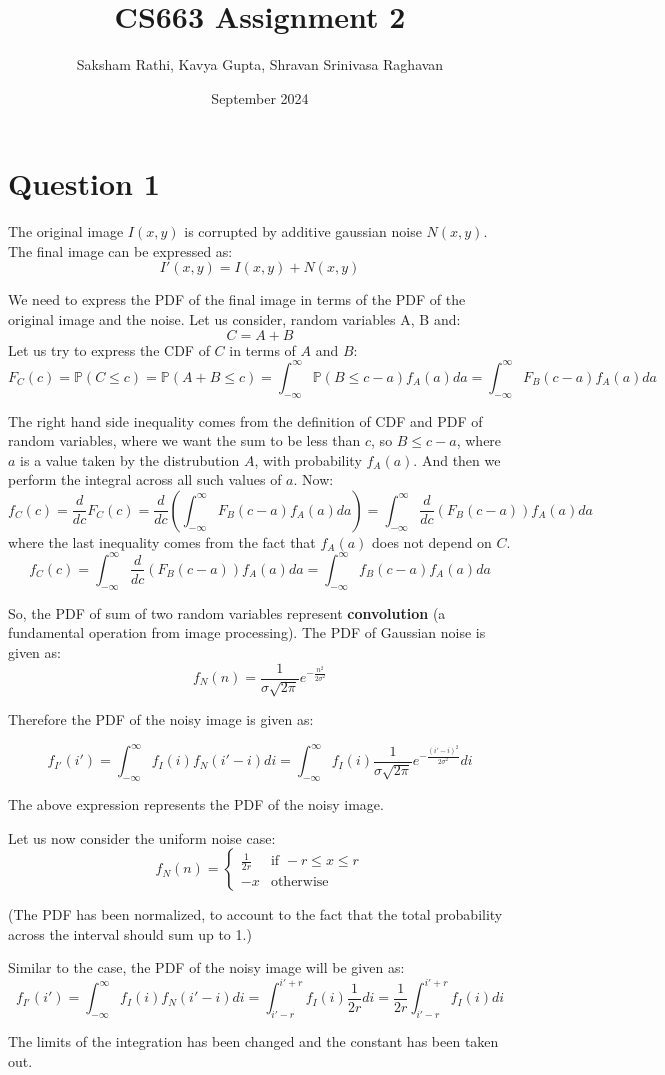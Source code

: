 \documentclass[12pt]{article}
\title{{\bf CS663 Assignment 2}}
\author{Saksham Rathi, Kavya Gupta, Shravan Srinivasa Raghavan}
\date{September 2024}
\begin{document}
\maketitle
\clearpage
\tableofcontents
\clearpage
\section*{Question 1}
The original image $I(x, y)$ is corrupted by additive gaussian noise $N(x, y)$. The final image can be expressed as:
\[I'(x, y) = I(x, y) + N(x, y)\]

We need to express the PDF of the final image in terms of the PDF of the original image and the noise. Let us consider, random variables A, B and:
\[C = A + B\]
Let us try to express the CDF of $C$ in terms of $A$ and $B$:
\[F_C(c) = \mathbb{P}(C \leq c) = \mathbb{P}(A+ B \leq c) = \int_{-\infty}^\infty \mathbb{P}(B \leq c - a)f_A(a)da = \int_{-\infty}^\infty F_B(c-a)f_A(a)da\]

The right hand side inequality comes from the definition of CDF and PDF of random variables, where we want the sum to be less than $c$, so $B\leq c-a$, where $a$ is a value taken by the distrubution $A$, with probability $f_A(a)$. And then we perform the integral across all such values of $a$. Now:
\[f_C(c) = \frac{d}{dc}F_C(c) = \frac{d}{dc}(\int_{-\infty}^\infty F_B(c-a)f_A(a)da) = \int_{-\infty}^\infty \frac{d}{dc}(F_B(c-a))f_A(a)da\]
where the last inequality comes from the fact that $f_A(a)$ does not depend on $C$.
\[f_C(c) = \int_{-\infty}^\infty \frac{d}{dc}(F_B(c-a))f_A(a)da = \int_{-\infty}^\infty f_B(c-a)f_A(a)da\]

So, the PDF of sum of two random variables represent \textbf{convolution} (a fundamental operation from image processing). The PDF of Gaussian noise is given as:
\[f_N(n) = \frac{1}{\sigma\sqrt{2\pi}}e^{-\frac{n^2}{2\sigma^2}}\]

Therefore the PDF of the noisy image is given as:

\[f_{I'}(i') = \int_{-\infty}^\infty f_I(i)f_N(i'-i)di = \int_{-\infty}^\infty f_I(i)\frac{1}{\sigma\sqrt{2\pi}}e^{-\frac{(i'-i)^2}{2\sigma^2}}di\]

The above expression represents the PDF of the noisy image.


Let us now consider the uniform noise case:
\[f_N(n) = 
\begin{cases} 
    \frac{1}{2r} & \text{if } -r \leq x \leq r \\
    -x  & \text{otherwise}
\end{cases}\]

(The PDF has been normalized, to account to the fact that the total probability across the interval should sum up to 1.)


Similar to the case, the PDF of the noisy image will be given as:
\[f_{I'}(i') = \int_{-\infty}^\infty f_I(i)f_N(i'-i)di = \int_{i'-r}^{i'+r} f_I(i)\frac{1}{2r}di = \frac{1}{2r}\int_{i'-r}^{i'+r} f_I(i)di\]


The limits of the integration has been changed and the constant has been taken out.
\end{document}

